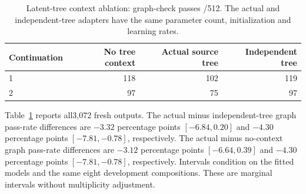 \begin{table}[t]
\centering
\caption{Latent-tree context ablation: graph-check passes /512. The actual and independent-tree adapters have the same parameter count, initialization and learning rates.}
\begin{tabular}{lrrr}
\toprule
Continuation & No tree context & Actual source tree & Independent tree\\
\midrule
1 & 118 & 102 & 119\\
2 & 97 & 75 & 97\\
\bottomrule
\end{tabular}
\label{tab:context}
\end{table}
Table~\ref{tab:context} reports all3,072 fresh outputs.
The actual minus independent-tree graph pass-rate differences are $-3.32$ percentage points $[-6.84,0.20]$ and $-4.30$ percentage points $[-7.81,-0.78]$, respectively.
The actual minus no-context graph pass-rate differences are $-3.12$ percentage points $[-6.64,0.39]$ and $-4.30$ percentage points $[-7.81,-0.78]$, respectively.
Intervals condition on the fitted models and the same eight development compositions. These are marginal intervals without multiplicity adjustment.
